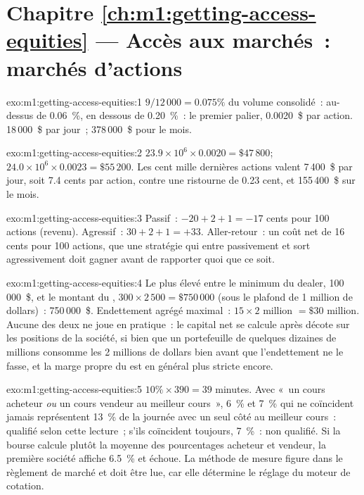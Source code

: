 \section*{Chapitre \ref{ch:m1:getting-access-equities} --- Accès aux marchés~: marchés d'actions}

\begin{solution}{exo:m1:getting-access-equities:1}
$9/12\,000 = 0.075\%$ du volume consolidé~: au-dessus de 0.06~\%, en dessous de 0.20~\%~: le
premier palier, 0.0020~\$ par action. 18\,000~\$ par jour~; 378\,000~\$ pour le mois.
\end{solution}

\begin{solution}{exo:m1:getting-access-equities:2}
$23.9 \times 10^6 \times 0.0020 = \$47\,800$; $24.0 \times 10^6 \times 0.0023 =
\$55\,200$. Les cent mille dernières actions valent 7\,400~\$ par jour, soit 7.4 cents
par action, contre une ristourne de 0.23 cent, et 155\,400~\$ sur le mois.
\end{solution}

\begin{solution}{exo:m1:getting-access-equities:3}
Passif~: $-20 + 2 + 1 = -17$ cents pour 100 actions (revenu). Agressif~: $30 + 2
+ 1 = +33$. Aller-retour~: un coût net de 16 cents pour 100 actions, que
une stratégie qui entre passivement et sort agressivement doit gagner avant de
rapporter quoi que ce soit.
\end{solution}

\begin{solution}{exo:m1:getting-access-equities:4}
Le plus élevé entre le minimum du dealer, 100\,000~\$, et le montant du , $300
\times 2\,500 = \$750\,000$ (sous le plafond de 1 million de dollars)~: 750\,000~\$. Endettement
agrégé maximal~: $15 \times 2$ million $= \$30$ million. Aucune des deux ne joue en
pratique~: le capital net se calcule après décote sur les positions de la société, si bien que
un portefeuille de quelques dizaines de millions consomme les 2 millions de dollars bien avant
que l'endettement ne le fasse, et la marge propre du  est en général
plus stricte encore.
\end{solution}

\begin{solution}{exo:m1:getting-access-equities:5}
$10\% \times 390 = 39$ minutes. Avec «~un cours acheteur \emph{ou} un cours vendeur au meilleur cours~»,
6~\% et 7~\% qui ne coïncident jamais représentent 13~\% de la journée avec un seul côté au
meilleur cours~: qualifié selon cette lecture~; s'ils coïncident toujours, 7~\%~: non
qualifié. Si la bourse calcule plutôt la moyenne des pourcentages acheteur et vendeur,
la première société affiche 6.5~\% et échoue. La méthode de mesure figure dans le règlement de marché et
doit être lue, car elle détermine le réglage du moteur de cotation.
\end{solution}

